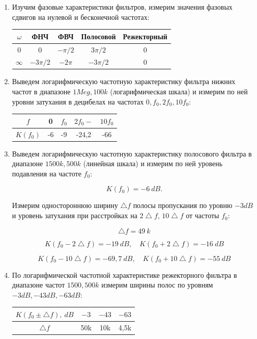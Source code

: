 \documentclass[a4paper, 12pt]{article}%
\begin{document}
\begin{enumerate}
\item Изучим фазовые характеристики фильтров, измерим значения фазовых сдвигов на нулевой и бесконечной частотах:

\begin{center}
\begin{tabular}{|c|c|c|c|c|}
\hline 
$\omega$ & ФНЧ & ФВЧ & Полосовой & Режекторный \\ 
\hline 
0 & 0 & $-\pi/2$ & $3\pi/2$ & 0 \\ 
\hline 
$\infty$ & $-3\pi/2$ & $-2\pi$ & $-3\pi/2$ & 0 \\ 
\hline 
\end{tabular}
\end{center} 

\item Выведем логарифмическую частотную характеристику фильтра нижних частот в диапазоне $1Meg,100k$ (логарифмическая шкала) и измерим по ней уровни затухания в децибелах на частотах $0, f_0, 2f_0, 10f_0$:

\begin{center}
\begin{tabular}{|c|c|c|c|c|}
\hline 
$f$ & 0 & $f_0$ & $2f_0-$ & $10f_0$ \\ 
\hline 
$K(f_0)$ & -6 & -9 & -24,2 & -66 \\ 
\hline 
\end{tabular} 
\end{center}

\item Выведем логарифмическую частотную характеристику полосового фильтра в диапазоне $1500k,500k$ (линейная шкала) и измерим по ней уровень подавления на частоте $f_0$:

\[K(f_0) = -6 \: dB.\]

Измерим одностороннюю ширину $\bigtriangleup f$ полосы пропускания по уровню $-3 dB$ и уровень затухания при расстройках на $2\bigtriangleup f$, $10\bigtriangleup f$ от частоты $f_0$:

\[\bigtriangleup f = 49\: k\]

\[K(f_0 - 2\bigtriangleup f) = -19 \: dB, \quad K(f_0 + 2\bigtriangleup f) = -16 \: dB\]

\[K(f_0 - 10\bigtriangleup f) = -69,7 \: dB, \quad K(f_0 + 10\bigtriangleup f) = -55 \: dB\]

\item По логарифмической частотной характеристике режекторного фильтра в диапазоне частот $1500,500k$ измерим ширины полос по уровням $-3dB, -43dB, -63dB$:

\begin{center}
\begin{tabular}{|c|c|c|c|}
\hline 
$K(f_0 \pm \bigtriangleup f), \: dB$ & $-3$ & $-43$ & $-63$ \\ 
\hline 
$\bigtriangleup f$ & 50k & 10k & 4,5k \\ 
\hline 
\end{tabular} 
\end{center}

\end{enumerate}
\end{document}
